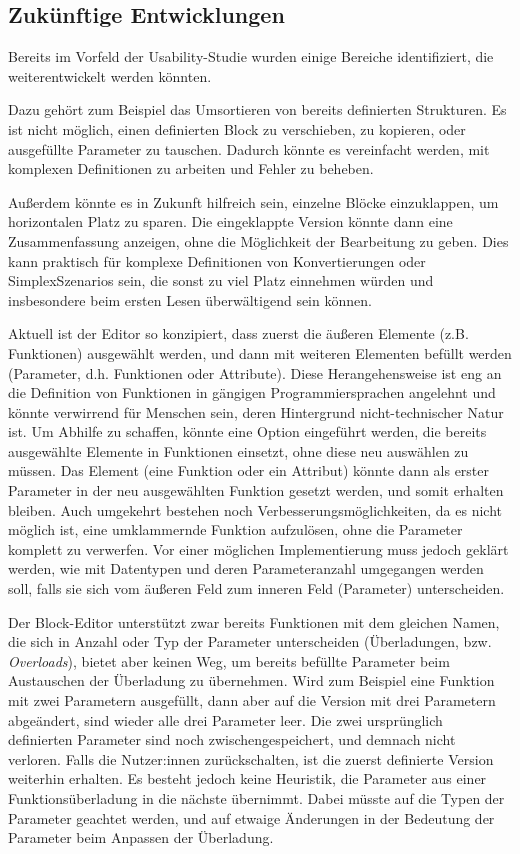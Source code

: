 \subsection{Zukünftige Entwicklungen}
Bereits im Vorfeld der Usability-Studie wurden einige Bereiche identifiziert, die weiterentwickelt werden könnten.

Dazu gehört zum Beispiel das Umsortieren von bereits definierten Strukturen. Es ist nicht möglich, einen definierten Block zu verschieben, zu kopieren, oder ausgefüllte Parameter zu tauschen. Dadurch könnte es vereinfacht werden, mit komplexen Definitionen zu arbeiten und Fehler zu beheben.

Außerdem könnte es in Zukunft hilfreich sein, einzelne Blöcke einzuklappen, um horizontalen Platz zu sparen. Die eingeklappte Version könnte dann eine Zusammenfassung anzeigen, ohne die Möglichkeit der Bearbeitung zu geben. Dies kann praktisch für komplexe Definitionen von Konvertierungen oder SimplexSzenarios sein, die sonst zu viel Platz einnehmen würden und insbesondere beim ersten Lesen überwältigend sein können.

Aktuell ist der Editor so konzipiert, dass zuerst die äußeren Elemente (z.B. Funktionen) ausgewählt werden, und dann mit weiteren Elementen befüllt werden (Parameter, d.h. Funktionen oder Attribute). Diese Herangehensweise ist eng an die Definition von Funktionen in gängigen Programmiersprachen angelehnt und könnte verwirrend für Menschen sein, deren Hintergrund nicht-technischer Natur ist. Um Abhilfe zu schaffen, könnte eine Option eingeführt werden, die bereits ausgewählte Elemente in Funktionen einsetzt, ohne diese neu auswählen zu müssen. Das Element (eine Funktion oder ein Attribut) könnte dann als erster Parameter in der neu ausgewählten Funktion gesetzt werden, und somit erhalten bleiben. Auch umgekehrt bestehen noch Verbesserungsmöglichkeiten, da es nicht möglich ist, eine umklammernde Funktion aufzulösen, ohne die Parameter komplett zu verwerfen. Vor einer möglichen Implementierung muss jedoch geklärt werden, wie mit Datentypen und deren Parameteranzahl umgegangen werden soll, falls sie sich vom äußeren Feld zum inneren Feld (Parameter) unterscheiden.

Der Block-Editor unterstützt zwar bereits Funktionen mit dem gleichen Namen, die sich in Anzahl oder Typ der Parameter unterscheiden (Überladungen, bzw. \textit{Overloads}), bietet aber keinen Weg, um bereits befüllte Parameter beim Austauschen der Überladung zu übernehmen. Wird zum Beispiel eine Funktion mit zwei Parametern ausgefüllt, dann aber auf die Version mit drei Parametern abgeändert, sind wieder alle drei Parameter leer. Die zwei ursprünglich definierten Parameter sind noch zwischengespeichert, und demnach nicht verloren. Falls die Nutzer:innen zurückschalten, ist die zuerst definierte Version weiterhin erhalten. Es besteht jedoch keine Heuristik, die Parameter aus einer Funktionsüberladung in die nächste übernimmt. Dabei müsste auf die Typen der Parameter geachtet werden, und auf etwaige Änderungen in der Bedeutung der Parameter beim Anpassen der Überladung.

